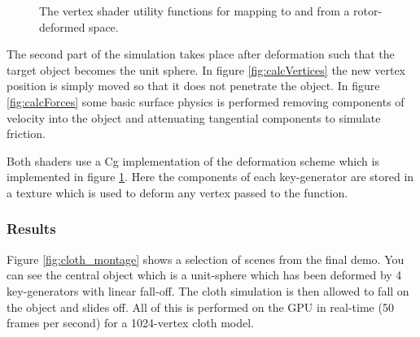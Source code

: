 \begin{figure}[p]
\centering
\scalebox{0.7}{
\begin{minipage}{\textwidth}
\singlespacing

\end{minipage}}
\caption{\label{fig:map}The vertex shader utility functions for mapping to and
  from a rotor-deformed space.}
\end{figure}

The second part of the simulation takes place after deformation such that the
target object becomes the unit sphere. In figure \ref{fig:calcVertices} the new
vertex position is simply moved so that it does not penetrate the object. In
figure \ref{fig:calcForces} some basic surface physics is performed removing
components of velocity into the object and attenuating tangential components to
simulate friction. 

Both shaders use a Cg implementation of the deformation scheme which is
implemented in figure \ref{fig:map}. Here the components of each key-generator
are stored in a texture which is used to deform any vertex passed to the
function.

\subsubsection{Results}

Figure \ref{fig:cloth_montage} shows a selection of scenes from the final demo.
You can see the central object which is a unit-sphere which has been deformed
by 4 key-generators with linear fall-off. The cloth simulation is then allowed
to fall on the object and slides off. All of this is performed on the GPU in
real-time (50 frames per second) for a 1024-vertex cloth model.

